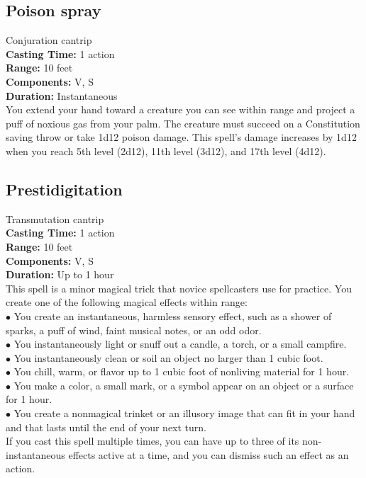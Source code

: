 \documentclass[11pt, A4paper, english]{article}
\begin{document}
		\subsection{Poison spray}
Conjuration cantrip \\
\textbf{Casting Time:} 1 action \\
\textbf{Range:} 10 feet \\
\textbf{Components:} V, S \\
\textbf{Duration:} Instantaneous \\
You extend your hand toward a creature you can see within range and project a puff of noxious gas from your palm. The creature must succeed on a Constitution saving throw or take 1d12 poison damage. This spell’s damage increases by 1d12 when you reach 5th level (2d12), 11th level (3d12), and 17th level (4d12).

		\subsection{Prestidigitation}
Transmutation cantrip \\
\textbf{Casting Time:} 1 action \\
\textbf{Range:} 10 feet \\
\textbf{Components:} V, S \\
\textbf{Duration:} Up to 1 hour \\
This spell is a minor magical trick that novice spellcasters use for practice. You create one of the following magical effects within range: \\
\indent $\bullet$ You create an instantaneous, harmless sensory effect, such as a shower of sparks, a puff of wind, faint musi­cal notes, or an odd odor. \\
\indent $\bullet$ You instantaneously light or snuff out a candle, a torch, or a small campfire. \\
\indent $\bullet$ You instantaneously clean or soil an object no larger than 1  cubic foot. \\
\indent $\bullet$ You chill, warm, or flavor up to 1 cubic foot of nonliv­ing material for 1 hour. \\
\indent $\bullet$ You make a color, a small mark, or a symbol appear on an object or a surface for 1 hour. \\
\indent $\bullet$ You create a nonmagical trinket or an illusory image that can fit in your hand and that lasts until the end of your next turn. \\
If you cast this spell multiple times, you can have up to three of its non-instantaneous effects active at a time, and you can dismiss such an effect as an action.
\end{document}
